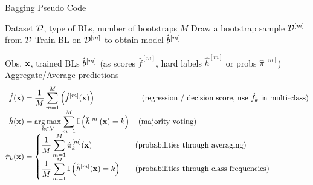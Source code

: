 \documentclass[11pt,compress,t,notes=noshow, xcolor=table]{beamer}
\begin{document}
\begin{vbframe}{Bagging Pseudo Code}
\vspace{-2ex}
\begin{algorithm}[H]
  \scriptsize
  \caption*{Bagging algorithm: Training}
  \begin{algorithmic}[1]
     Dataset $\mathcal{D}$, type of BLs, number of bootstraps $M$
      \State Draw a bootstrap sample $\mathcal{D}^{[m]}$ from $\mathcal{D}$
      \State Train BL on $\mathcal{D}^{[m]}$ to obtain model $\hat{b}^{[m]}$
    \EndFor
  \end{algorithmic}
\end{algorithm}
\vspace{-0.7cm}
\begin{algorithm}[H]
  \scriptsize
  \caption*{Bagging algorithm: Prediction}
  \begin{algorithmic}[1]
     Obs. $\mathbf{x}$, trained BLs $\hat{b}^{[m]}$ (as scores $\hat{f}^{[m]}$, hard labels $\hat{h}^{[m]}$ or probs $\hat \pi^{[m]}$)
    \State Aggregate/Average predictions
    \vspace{-2ex}
    \begin{align*}
      \hat{f}(\mathbf{x}) &=  \frac{1}{M} \sum_{m=1}^M \left(\hat{f}^{[m]}(\mathbf{x})\right) \qquad \qquad \qquad \text{(regression / decision score, use $\hat{f}_k$ in multi-class)} \\[-1ex]
      \hat{h}(\mathbf{x}) &= \operatorname*{arg\,max}_{k \in \mathcal{Y}} \sum_{m=1}^M \mathbb{I}\left(\hat{h}^{[m]}(\mathbf{x}) = k\right) \quad \text{(majority voting)} \\[-1ex]
    \hat \pi_{k}(\mathbf{x}) &=
    \left\{
    \begin{aligned}
    & \frac{1}{M} \sum_{m=1}^M \hat \pi_{k}^{[m]}(\mathbf{x}) \quad && \text{(probabilities through averaging)} \\[-1ex]
    & \frac{1}{M} \sum_{m=1}^M \mathbb{I}\left(\hat{h}^{[m]}(\mathbf{x}) = k\right) \quad && \text{(probabilities through class frequencies)}
    \end{aligned}
    \right.
    \end{align*}
    \vspace{-3ex}
  \end{algorithmic}
\end{algorithm}
\vspace{-3ex}
\end{vbframe}
\end{document}
